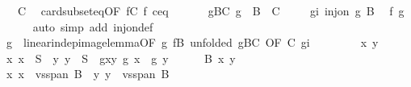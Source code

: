 \begin{isabellebody}
\ {\isachardoublequoteopen}{\isasymdots}\ {\isacharequal}{\kern0pt}\ C{\isachardoublequoteclose}\ \isamarkupfalse%
\ card{\isacharunderscore}{\kern0pt}subset{\isacharunderscore}{\kern0pt}eq{\isacharbrackleft}{\kern0pt}OF\ fC\ f{\isacharparenleft}{\kern0pt}{}{\isacharparenright}{\kern0pt}\ ceq{\isacharbrackright}{\kern0pt}\ \isacommand{{\isachardot}{\kern0pt}}\isamarkupfalse%
\isanewline
\ \ \isamarkupfalse%
\ \isamarkupfalse%
\ gBC{\isacharcolon}{\kern0pt}\ {\isachardoublequoteopen}g\ {\isacharbackquote}{\kern0pt}\ B\ {\isacharequal}{\kern0pt}\ C{\isachardoublequoteclose}\ \isacommand{{\isachardot}{\kern0pt}}\isamarkupfalse%
\isanewline
\ \ \isamarkupfalse%
\ gi{\isacharcolon}{\kern0pt}\ {\isachardoublequoteopen}inj{\isacharunderscore}{\kern0pt}on\ g\ B{\isachardoublequoteclose}\ \isamarkupfalse%
\ f{\isacharparenleft}{\kern0pt}{}{\isacharparenright}{\kern0pt}\ g{\isacharparenleft}{\kern0pt}{}{\isacharparenright}{\kern0pt}\isanewline
\ \ \ \ \isamarkupfalse%
\ {\isacharparenleft}{\kern0pt}auto\ simp\ add{\isacharcolon}{\kern0pt}\ inj{\isacharunderscore}{\kern0pt}on{\isacharunderscore}{\kern0pt}def{\isacharparenright}{\kern0pt}\isanewline
\ \ \isamarkupfalse%
\ g{}\ {\isacharequal}{\kern0pt}\ linear{\isacharunderscore}{\kern0pt}indep{\isacharunderscore}{\kern0pt}image{\isacharunderscore}{\kern0pt}lemma{\isacharbrackleft}{\kern0pt}OF\ g{\isacharparenleft}{\kern0pt}{}{\isacharparenright}{\kern0pt}\ fB{\isacharcomma}{\kern0pt}\ unfolded\ gBC{\isacharcomma}{\kern0pt}\ OF\ C{\isacharparenleft}{\kern0pt}{}{\isacharparenright}{\kern0pt}\ gi{\isacharbrackright}{\kern0pt}\isanewline
\ \ \isacommand{{\isacharbraceleft}{\kern0pt}}\isamarkupfalse%
\isanewline
\ \ \ \ \isamarkupfalse%
\ x\ y\isanewline
\ \ \ \ \isamarkupfalse%
\ x{\isacharcolon}{\kern0pt}\ {\isachardoublequoteopen}x\ {\isasymin}\ S{\isachardoublequoteclose}\ \ y{\isacharcolon}{\kern0pt}\ {\isachardoublequoteopen}y\ {\isasymin}\ S{\isachardoublequoteclose}\ \ gxy{\isacharcolon}{\kern0pt}\ {\isachardoublequoteopen}g\ x\ {\isacharequal}{\kern0pt}\ g\ y{\isachardoublequoteclose}\isanewline
\ \ \ \ \isamarkupfalse%
\ B{\isacharparenleft}{\kern0pt}{}{\isacharparenright}{\kern0pt}\ x\ y\ \isamarkupfalse%
\ x{\isacharprime}{\kern0pt}{\isacharcolon}{\kern0pt}\ {\isachardoublequoteopen}x\ {\isasymin}\ vs{}{\isachardot}{\kern0pt}span\ B{\isachardoublequoteclose}\ \ y{\isacharprime}{\kern0pt}{\isacharcolon}{\kern0pt}\ {\isachardoublequoteopen}y\ {\isasymin}\ vs{}{\isachardot}{\kern0pt}span\ B{\isachardoublequoteclose}\isanewline

\end{isabellebody}
